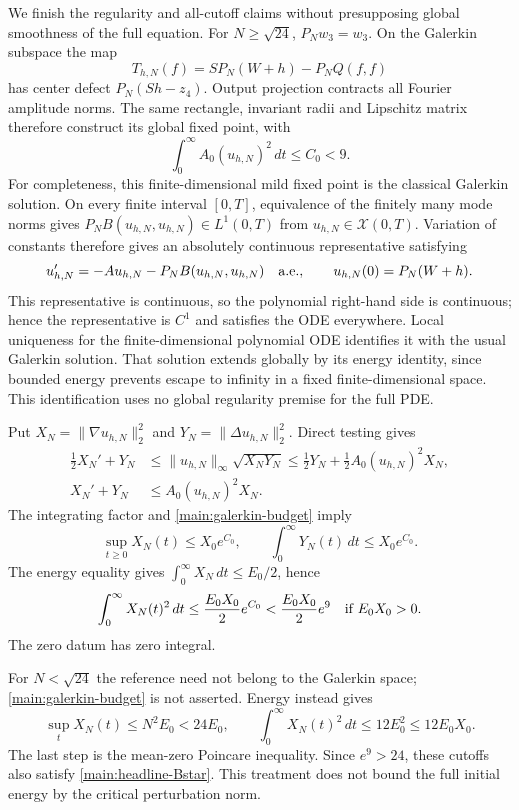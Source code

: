 We finish the regularity and all-cutoff claims without presupposing global
smoothness of the full equation. For $N\ge\sqrt{24}$, $P_Nw_3=w_3$.
On the Galerkin subspace the map
\[
 T_{h,N}(f)=SP_N(W+h)-P_NQ(f,f)
\]
has center defect $P_N(Sh-z_4)$. Output projection contracts all Fourier
amplitude norms. The same rectangle, invariant radii and Lipschitz matrix
therefore construct its global fixed point, with
\begin{equation}
 \int_0^\infty A_0(u_{h,N})^2\,dt\le C_0<9.
 \label{main:galerkin-budget}
\end{equation}
For completeness, this finite-dimensional mild fixed point is the
classical Galerkin solution. On every finite interval $[0,T]$, equivalence
of the finitely many mode norms gives
$P_NB(u_{h,N},u_{h,N})\in L^1(0,T)$ from
$u_{h,N}\in\mathcal X(0,T)$. Variation of constants therefore gives an
absolutely continuous representative satisfying
\[
 u_{h,N}'=-Au_{h,N}-P_NB(u_{h,N},u_{h,N})
 \quad\hbox{a.e.},\qquad
 u_{h,N}(0)=P_N(W+h).
\]
This representative is continuous, so the polynomial right-hand side is
continuous; hence the representative is $C^1$ and satisfies the ODE
everywhere. Local uniqueness for the finite-dimensional polynomial ODE
identifies it with the usual Galerkin solution. That solution extends
globally by its energy identity, since bounded energy prevents escape to
infinity in a fixed finite-dimensional space. This identification uses no
global regularity premise for the full PDE.

Put $X_N=\|\nabla u_{h,N}\|_2^2$ and
$Y_N=\|\Delta u_{h,N}\|_2^2$. Direct testing gives
\begin{align}
 \tfrac12X_N'+Y_N
 &\le\|u_{h,N}\|_\infty\sqrt{X_NY_N}
 \le\tfrac12Y_N+\tfrac12 A_0(u_{h,N})^2X_N,\nonumber\\
 X_N'+Y_N&\le A_0(u_{h,N})^2X_N.\label{main:H1}
\end{align}
The integrating factor and \eqref{main:galerkin-budget} imply
\begin{equation}
 \sup_{t\ge0}X_N(t)\le X_0e^{C_0},\qquad
 \int_0^\infty Y_N(t)\,dt\le X_0e^{C_0}.
 \label{main:strong-bounds}
\end{equation}
The energy equality gives $\int_0^\infty X_N\,dt\le E_0/2$, hence
\begin{equation}
 \int_0^\infty X_N(t)^2\,dt
 \le\frac{E_0X_0}{2}e^{C_0}<\frac{E_0X_0}{2}e^9
 \quad\hbox{if }E_0X_0>0.\label{main:large-cutoff}
\end{equation}
The zero datum has zero integral.

For $N<\sqrt{24}$ the reference need not belong to the Galerkin space;
\eqref{main:galerkin-budget} is not asserted. Energy instead gives
\[
 \sup_tX_N(t)\le N^2E_0<24E_0,\qquad
 \int_0^\infty X_N(t)^2\,dt\le12E_0^2\le12E_0X_0.
\]
The last step is the mean-zero Poincare inequality. Since $e^9>24$, these
cutoffs also satisfy \eqref{main:headline-Bstar}. This treatment does not
bound the full initial energy by the critical perturbation norm.

